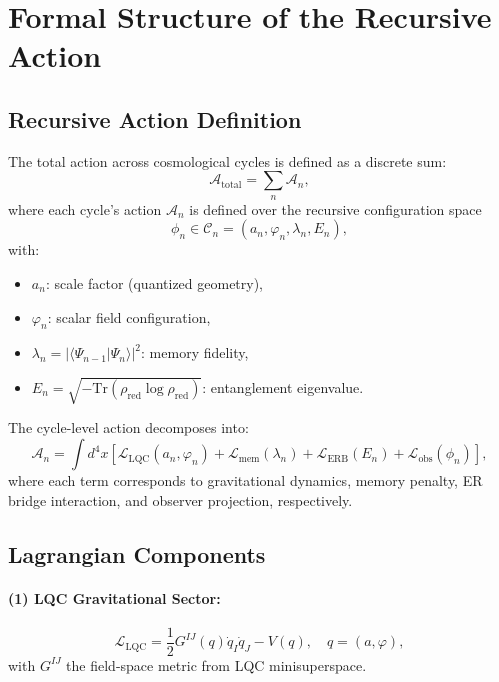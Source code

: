 \section{Formal Structure of the Recursive Action}
\label{sec:recursive-action-formal}

\subsection{Recursive Action Definition}

The total action across cosmological cycles is defined as a discrete sum:
\begin{equation}
\mathcal{A}_{\text{total}} = \sum_n \mathcal{A}_n,
\end{equation}
where each cycle’s action \( \mathcal{A}_n \) is defined over the recursive configuration space
\[
\phi_n \in \mathcal{C}_n = (a_n, \varphi_n, \lambda_n, E_n),
\]
with:
\begin{itemize}
  \item \( a_n \): scale factor (quantized geometry),
  \item \( \varphi_n \): scalar field configuration,
  \item \( \lambda_n = |\langle \Psi_{n-1} | \Psi_n \rangle|^2 \): memory fidelity,
  \item \( E_n = \sqrt{-\mathrm{Tr}(\rho_{\text{red}} \log \rho_{\text{red}})} \): entanglement eigenvalue.
\end{itemize}

The cycle-level action decomposes into:
\[
\mathcal{A}_n = \int d^4x \left[
\mathcal{L}_{\text{LQC}}(a_n, \varphi_n) +
\mathcal{L}_{\text{mem}}(\lambda_n) +
\mathcal{L}_{\text{ERB}}(E_n) +
\mathcal{L}_{\text{obs}}(\phi_n)
\right],
\]
where each term corresponds to gravitational dynamics, memory penalty, ER bridge interaction, and observer projection, respectively.

\subsection{Lagrangian Components}

\paragraph{(1) LQC Gravitational Sector:}
\[
\mathcal{L}_{\text{LQC}} = \frac{1}{2} G^{IJ}(q) \dot{q}_I \dot{q}_J - V(q), \quad q = (a, \varphi),
\]
with \( G^{IJ} \) the field-space metric from LQC minisuperspace.

